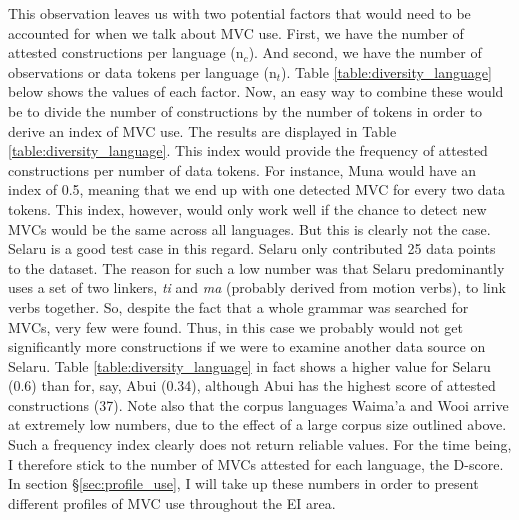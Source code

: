 This observation leaves us with two potential factors that would need to be accounted for when we talk about MVC use. First, we have the number of attested constructions per language (n$_c$). And second, we have the number of observations or data tokens per language (n$_t$). Table \ref{table:diversity_language} below shows the values of each factor. Now, an easy way to combine these would be to divide the number of constructions by the number of tokens in order to derive an index of MVC use. The results are displayed in Table \ref{table:diversity_language}. This index would provide the frequency of attested constructions per number of data tokens. For instance, Muna would have an index of 0.5, meaning that we end up with one detected MVC for every two data tokens. This index, however, would only work well if the chance to detect new MVCs would be the same across all languages. But this is clearly not the case. Selaru is a good test case in this regard. Selaru only contributed 25 data points to the dataset. The reason for such a low number was that Selaru predominantly uses a set of two linkers, \textit{ti} and \textit{ma} (probably derived from motion verbs), to link verbs together. So, despite the fact that a whole grammar was searched for MVCs, very few were found. Thus, in this case we probably would not get significantly more constructions if we were to examine another data source on Selaru. Table \ref{table:diversity_language} in fact shows a higher value for Selaru (0.6) than for, say, Abui (0.34), although Abui has the highest score of attested constructions (37). Note also that the corpus languages Waima'a and Wooi arrive at extremely low numbers, due to the effect of a large corpus size outlined above. Such a frequency index clearly does not return reliable values. For the time being, I therefore stick to the number of MVCs attested for each language, the D-score. In section §\ref{sec:profile_use}, I will take up these numbers in order to present different profiles of MVC use throughout the EI area.

